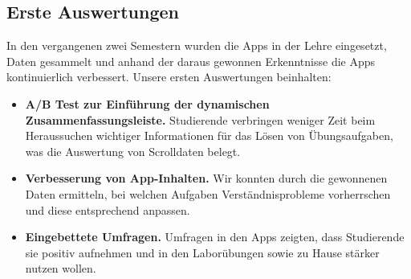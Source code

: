 \documentclass[a0,portrait]{a0poster}
\begin{document}
\begin{multicols}{2}
\section*{Erste Auswertungen}

In den vergangenen zwei Semestern wurden die Apps in der Lehre eingesetzt, Daten gesammelt und anhand der daraus gewonnen Erkenntnisse die Apps kontinuierlich verbessert. Unsere ersten Auswertungen beinhalten:

\begin{itemize}
    \item \textbf{A/B Test zur Einführung der dynamischen Zusammenfassungsleiste.} Studierende verbringen weniger Zeit beim Heraussuchen wichtiger Informationen für das Lösen von Übungsaufgaben, was die Auswertung von Scrolldaten belegt.
    \item \textbf{Verbesserung von App-Inhalten.} Wir konnten durch die gewonnenen Daten ermitteln, bei welchen Aufgaben Verständnisprobleme vorherrschen und diese entsprechend anpassen.
    \item \textbf{Eingebettete Umfragen.} Umfragen in den Apps zeigten, dass Studierende sie positiv aufnehmen und in den Laborübungen sowie zu Hause stärker nutzen wollen.
\end{itemize}


\end{multicols}
\end{document}
